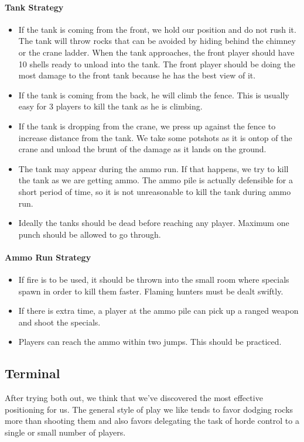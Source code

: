 \paragraph{Tank Strategy}
\begin{itemize}
\item If the tank is coming from the front, we hold our position and do not rush it. The tank will throw rocks that can be avoided by hiding behind the chimney or the crane ladder. When the tank approaches, the front player should have 10 shells ready to unload into the tank. The front player should be doing the most damage to the front tank because he has the best view of it.
\item If the tank is coming from the back, he will climb the fence. This is usually easy for 3 players to kill the tank as he is climbing.
\item If the tank is dropping from the crane, we press up against the fence to increase distance from the tank. We take some potshots as it is ontop of the crane and unload the brunt of the damage as it lands on the ground.
\item The tank may appear during the ammo run. If that happens, we try to kill the tank as we are getting ammo. The ammo pile is actually defensible for a short period of time, so it is not unreasonable to kill the tank during ammo run.
\item Ideally the tanks should be dead before reaching any player. Maximum one punch should be allowed to go through.
\end{itemize}

\paragraph{Ammo Run Strategy}
\begin{itemize}
\item If fire is to be used, it should be thrown into the small room where specials spawn in order to kill them faster. Flaming hunters must be dealt swiftly.
\item If there is extra time, a player at the ammo pile can pick up a ranged weapon and shoot the specials.
\item Players can reach the ammo within two jumps. This should be practiced.
\end{itemize}

\subsection{Terminal}
After trying both out, we think that we've discovered the most effective positioning for us. The general style of play we like tends to favor dodging rocks more than shooting them and also favors delegating the task of horde control to a single or small number of players.

